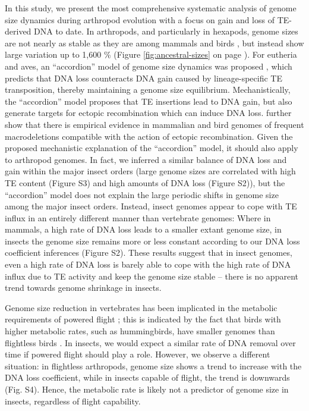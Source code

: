 In this study, we present the most comprehensive systematic analysis of
genome size dynamics during arthropod evolution with a focus on gain and
loss of TE-derived DNA to date. In arthropods, and particularly in
hexapods, genome sizes are not nearly as stable as they are among
mammals and birds \citep{Kapusta2017a}, but instead show large variation
up to 1,600 \% (Figure \ref{fig:ancestral-sizes} on page \pageref{fig:ancestral-sizes}). For eutheria and aves, an ``accordion'' model
of genome size dynamics was proposed \citep{Kapusta2017a}, which predicts
that DNA loss counteracts DNA gain caused by lineage-specific TE
transposition, thereby maintaining a genome size equilibrium.
Mechanistically, the ``accordion'' model proposes that TE insertions
lead to DNA gain, but also generate targets for ectopic recombination
which can induce DNA loss. \citet{Kapusta2017a} further show that there is
empirical evidence in mammalian and bird genomes of frequent
macrodeletions compatible with the action of ectopic recombination.
Given the proposed mechanistic explanation of the ``accordion'' model,
it should also apply to arthropod genomes. In fact, we inferred a
similar balance of DNA loss and gain within the major insect orders
(large genome sizes are correlated with high TE content (Figure
S3) and
high amounts of DNA loss (Figure S2)), but the ``accordion'' model does
not explain the large periodic shifts in genome size among the major
insect orders. Instead, insect genomes appear to cope with TE influx in
an entirely different manner than vertebrate genomes: Where in mammals,
a high rate of DNA loss leads to a smaller extant genome size, in
insects the genome size remains more or less constant according to our
DNA loss coefficient inferences (Figure S2). These results suggest that
in insect genomes, even a high rate of DNA loss is barely able to cope
with the high rate of DNA influx due to TE activity and keep the genome
size stable -- there is no apparent trend towards genome shrinkage in
insects.

Genome size reduction in vertebrates has been implicated in the
metabolic requirements of powered flight \citep{Wright2014}; this is
indicated by the fact that birds with higher metabolic rates, such as
hummingbirds, have smaller genomes than flightless birds
\citep{Gregory2005}. In insects, we would expect a similar rate of DNA
removal over time if powered flight should play a role. However, we
observe a different situation: in flightless arthropods, genome size
shows a trend to increase with the DNA loss coefficient, while in
insects capable of flight, the trend is downwards (Fig. S4). Hence, the
metabolic rate is likely not a predictor of genome size in insects,
regardless of flight capability.

